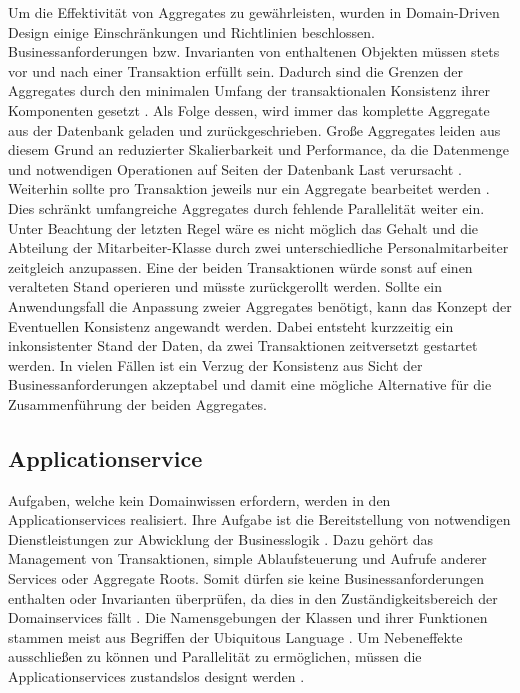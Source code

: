 Um die Effektivität von Aggregates zu gewährleisten, wurden in Domain-Driven Design einige Einschränkungen und Richtlinien beschlossen. Businessanforderungen bzw. Invarianten von enthaltenen Objekten müssen stets vor und nach einer Transaktion erfüllt sein. Dadurch sind die Grenzen der Aggregates durch den minimalen Umfang der transaktionalen Konsistenz ihrer Komponenten gesetzt \cite[S. 354]{Vernon.2015}. Als Folge dessen, wird immer das komplette Aggregate aus der Datenbank geladen und zurückgeschrieben. Große Aggregates leiden aus diesem Grund an reduzierter Skalierbarkeit und Performance, da die Datenmenge und notwendigen Operationen auf Seiten der Datenbank Last verursacht \cite[S. 355]{Vernon.2015}. Weiterhin sollte pro Transaktion jeweils nur ein Aggregate bearbeitet werden \cite[S. 354]{Vernon.2015}. Dies schränkt umfangreiche Aggregates durch fehlende Parallelität weiter ein. Unter Beachtung der letzten Regel wäre es nicht möglich das Gehalt und die Abteilung der Mitarbeiter-Klasse durch zwei unterschiedliche Personalmitarbeiter zeitgleich anzupassen. Eine der beiden Transaktionen würde sonst auf einen veralteten Stand operieren und müsste zurückgerollt werden. Sollte ein Anwendungsfall die Anpassung zweier Aggregates benötigt, kann das Konzept der Eventuellen Konsistenz angewandt werden. Dabei entsteht kurzzeitig ein inkonsistenter Stand der Daten, da zwei Transaktionen zeitversetzt gestartet werden. In vielen Fällen ist ein Verzug der Konsistenz aus Sicht der Businessanforderungen akzeptabel und damit eine mögliche Alternative für die Zusammenführung der beiden Aggregates. \cite[S. 364]{Vernon.2015}

\pagebreak

\subsection{Applicationservice}

Aufgaben, welche kein Domainwissen erfordern, werden in den Applicationservices realisiert. Ihre Aufgabe ist die Bereitstellung von notwendigen Dienstleistungen zur Abwicklung der Businesslogik \cite{Gorodinski.2012}. Dazu gehört das Management von Transaktionen, simple Ablaufsteuerung und Aufrufe anderer Services oder Aggregate Roots. Somit dürfen sie keine Businessanforderungen enthalten oder Invarianten überprüfen, da dies in den Zuständigkeitsbereich der Domainservices fällt \cite[S. 267]{Vernon.2015}. Die Namensgebungen der Klassen und ihrer Funktionen stammen meist aus Begriffen der Ubiquitous Language \cite[S. 105]{Evans.2011}. Um Nebeneffekte ausschließen zu können und Parallelität zu ermöglichen, müssen die Applicationservices zustandslos designt werden \cite[S. 105]{Evans.2011}.

